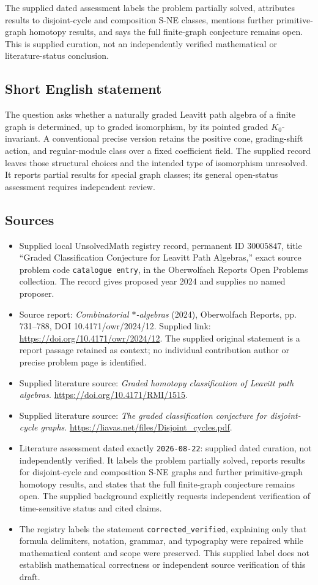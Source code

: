 \documentclass[11pt]{article}
\begin{document}
The supplied dated assessment labels the problem partially solved, attributes results to disjoint-cycle and composition S-NE classes, mentions further primitive-graph homotopy results, and says the full finite-graph conjecture remains open. This is supplied curation, not an independently verified mathematical or literature-status conclusion.
\subsection{Short English statement}
The question asks whether a naturally graded Leavitt path algebra of a finite graph is determined, up to graded isomorphism, by its pointed graded \(K_0\)-invariant. A conventional precise version retains the positive cone, grading-shift action, and regular-module class over a fixed coefficient field. The supplied record leaves those structural choices and the intended type of isomorphism unresolved. It reports partial results for special graph classes; its general open-status assessment requires independent review.
\subsection{Sources}
\begin{itemize}
\item Supplied local UnsolvedMath registry record, permanent ID \(30005847\), title ``Graded Classification Conjecture for Leavitt Path Algebras,'' exact source problem code \texttt{catalogue entry}, in the Oberwolfach Reports Open Problems collection. The record gives proposed year 2024 and supplies no named proposer.
\item Source report: \emph{Combinatorial \(*\)-algebras} (2024), Oberwolfach Reports, pp. 731--788, DOI 10.4171/owr/2024/12. Supplied link: \url{https://doi.org/10.4171/owr/2024/12}. The supplied original statement is a report passage retained as context; no individual contribution author or precise problem page is identified.
\item Supplied literature source: \emph{Graded homotopy classification of Leavitt path algebras}. \url{https://doi.org/10.4171/RMI/1515}.
\item Supplied literature source: \emph{The graded classification conjecture for disjoint-cycle graphs}. \url{https://liavas.net/files/Disjoint_cycles.pdf}.
\item Literature assessment dated exactly \texttt{2026-08-22}: supplied dated curation, not independently verified. It labels the problem partially solved, reports results for disjoint-cycle and composition S-NE graphs and further primitive-graph homotopy results, and states that the full finite-graph conjecture remains open. The supplied background explicitly requests independent verification of time-sensitive status and cited claims.
\item The registry labels the statement \texttt{corrected\_verified}, explaining only that formula delimiters, notation, grammar, and typography were repaired while mathematical content and scope were preserved. This supplied label does not establish mathematical correctness or independent source verification of this draft.
\end{itemize}
\end{document}
